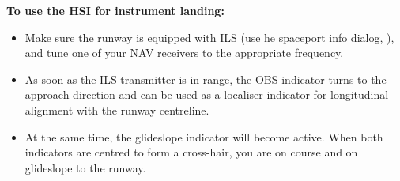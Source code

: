 \documentclass[Orbiter User Manual.tex]{subfiles}
\begin{document}
\noindent
\textbf{To use the HSI for instrument landing:}

\begin{itemize}
\item Make sure the runway is equipped with ILS (use he spaceport info dialog, \Ctrl{}), and tune one of your NAV receivers to the appropriate frequency.
\item As soon as the ILS transmitter is in range, the OBS indicator turns to the approach direction and can be used as a localiser indicator for longitudinal alignment with the runway centreline.
\item At the same time, the glideslope indicator will become active. When both indicators are centred to form a cross-hair, you are on course and on glideslope to the runway.
\end{itemize}
\end{document}
